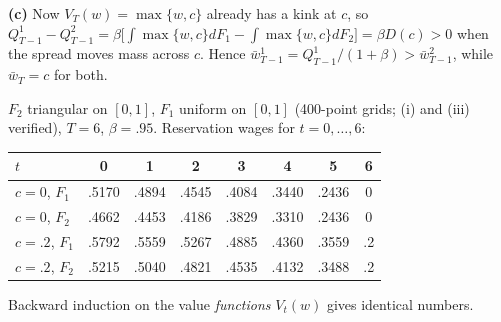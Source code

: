\documentclass[12pt, letterpaper]{article}
\newcommand{\wb}{\bar w}
\begin{document}
\begin{tcolorbox}[evenbox,title={Exercise 6.10 \quad Finite Horizon and Mean-Preserving Spread}]
\textbf{(c)} Now $V_T(w)=\max\{w,c\}$ already has a kink at $c$, so
$Q^1_{T-1}-Q^2_{T-1}=\beta\big[\int\max\{w,c\}dF_1-\int\max\{w,c\}dF_2\big]=\beta D(c)>0$ when the spread
moves mass across $c$. Hence $\wb^1_{T-1}=Q^1_{T-1}/(1+\beta)>\wb^2_{T-1}$, while $\wb_T=c$ for both.

\begin{tcolorbox}[databox]
$F_2$ triangular on $[0,1]$, $F_1$ uniform on $[0,1]$ (400-point grids; (i) and (iii) verified), $T=6$,
$\beta=.95$. Reservation wages for $t=0,\dots,6$:
\begin{center}\small
\begin{tabular}{@{}lccccccc@{}}
\toprule
$t$ & 0 & 1 & 2 & 3 & 4 & 5 & 6\\
\midrule
$c=0$, $F_1$ & .5170 & .4894 & .4545 & .4084 & .3440 & .2436 & 0\\
$c=0$, $F_2$ & .4662 & .4453 & .4186 & .3829 & .3310 & .2436 & 0\\
$c=.2$, $F_1$ & .5792 & .5559 & .5267 & .4885 & .4360 & .3559 & .2\\
$c=.2$, $F_2$ & .5215 & .5040 & .4821 & .4535 & .4132 & .3488 & .2\\
\bottomrule
\end{tabular}
\end{center}
Backward induction on the value \emph{functions} $V_t(w)$ gives identical numbers.
\end{tcolorbox}
\end{tcolorbox}
\end{document}
